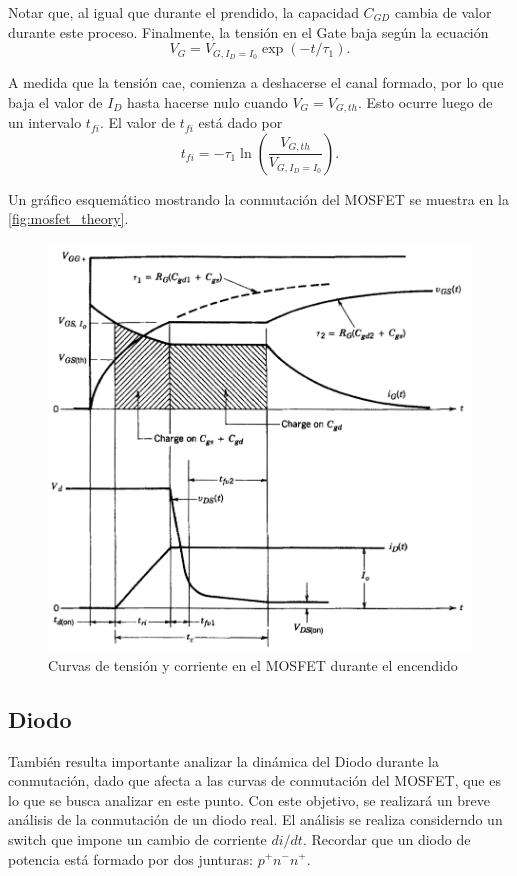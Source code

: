 \documentclass[e4_tp1_main.tex]{subfiles}
\begin{document}
Notar que, al igual que durante el prendido, la capacidad $C_{GD}$ cambia de valor durante este proceso. Finalmente, la tensión en el Gate baja según la ecuación
\begin{equation}
V_{G} = V_{G,I_D=I_0}\exp(-t/\tau_1).
\end{equation}

A medida que la tensión cae, comienza a deshacerse el canal formado, por lo que baja el valor de $I_D$ hasta hacerse nulo cuando $V_G=V_{G,th}$. Esto ocurre luego de un intervalo $t_{fi}$. El valor de $t_{fi}$ está dado por
\begin{equation}
t_{fi}= -\tau_1\ln\left(\frac{V_{G,th}}{V_{G,I_D=I_0}}\right).
\end{equation}

Un gráfico esquemático mostrando la conmutación del MOSFET se muestra en la \autoref{fig:mosfet_theory}.


\begin{figure}[H]
  \centering
  \includegraphics[width=\linewidth/2]{images/ej1/theory_mosfet.png}
  \caption{Curvas de tensión y corriente en el MOSFET durante el encendido}
  \label{fig:mosfet_theory}
\end{figure}

\subsection{Diodo}
También resulta importante analizar la dinámica del Diodo durante la conmutación, dado que afecta a las curvas de conmutación del MOSFET, que es lo que se busca analizar en este punto. Con este objetivo, se realizará un breve análisis de la conmutación de un diodo real. El análisis se realiza considerndo un switch que impone un cambio de corriente $di/dt$. Recordar que un diodo de potencia está formado por dos junturas: $p^+n^-n^+$.
\end{document}
